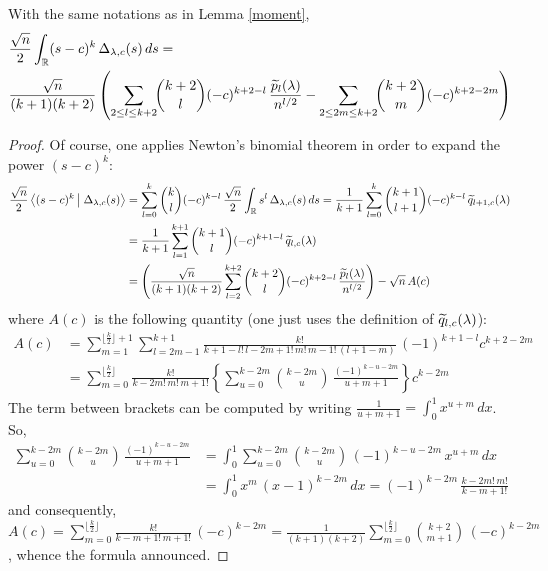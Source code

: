 \documentclass[10pt]{amsart}
\begin{document}
\begin{lemma}\label{transmoment}
With the same notations as in Lemma \ref{moment},
\begin{align*}&\frac{\sqrt{n}}{2}\int_{\mathbb{R}}(s-c)^{k}\,\Delta_{\lambda,c}(s)\,ds=\\
&\frac{\sqrt{n}}{(k+1)(k+2)}\left(\sum_{2 \leq l \leq k+2}\!\! \binom{k+2}{l} (-c)^{k+2-l}\,\frac{\widetilde{p}_{l}(\lambda)}{n^{l/2}}-\sum_{2 \leq 2m \leq k+2}\!\! \binom{k+2}{m} (-c)^{k+2-2m}\right)
\end{align*}
\end{lemma}\medskip
\begin{proof}
Of course, one applies Newton's binomial theorem in order to expand the power $(s-c)^{k}$:
\begin{align*}
\frac{\sqrt{n}}{2}\scal{(s-c)^{k}}{\Delta_{\lambda,c}(s)}&=\sum_{l=0}^{k}\binom{k}{l}(-c)^{k-l}\,\frac{\sqrt{n}}{2}\int_{\R}s^{l}\,\Delta_{\lambda,c}(s)\,ds=\frac{1}{k+1}\sum_{l=0}^{k}\binom{k+1}{l+1}(-c)^{k-l}\,\tilq_{l+1,c}(\lambda)\\
&=\frac{1}{k+1}\sum_{l=1}^{k+1}\binom{k+1}{l}(-c)^{k+1-l}\,\tilq_{l,c}(\lambda)\\
&=\left(\frac{\sqrt{n}}{(k+1)(k+2)}\sum_{l=2}^{k+2}\binom{k+2}{l}(-c)^{k+2-l}\,\frac{\tilp_{l}(\lambda)}{n^{l/2}}\right)-\sqrt{n}\,A(c)
\end{align*}
where $A(c)$ is the following quantity (one just uses the definition of $\widetilde{q}_{l,c}(\lambda)$):
\begin{align*}
A(c)&=\sum_{m=1}^{\lfloor \frac{k}{2}\rfloor +1} \sum_{l=2m-1}^{k+1} \frac{k!}{k+1-l!\,l-2m+1!\,m!\,m-1!\, (l+1-m)}\,(-1)^{k+1-l}c^{k+2-2m} \\
&=\sum_{m=0}^{\lfloor \frac{k}{2}\rfloor} \frac{k!}{k-2m!\,m!\,m+1!}\left\{\sum_{u=0}^{k-2m} \binom{k-2m}{u}\,\frac{(-1)^{k-u-2m}}{u+m+1}\right\}c^{k-2m}
\end{align*}
The term between brackets can be computed by writing $\frac{1}{u+m+1}=\int_{0}^{1} x^{u+m}\,dx$. So,
\begin{align*}
\sum_{u=0}^{k-2m} \binom{k-2m}{u}\,\frac{(-1)^{k-u-2m}}{u+m+1}&=\int_{0}^{1} \sum_{u=0}^{k-2m} \binom{k-2m}{u}\,(-1)^{k-u-2m}\,x^{u+m}\,dx\\
&=\int_{0}^{1}x^{m}\,(x-1)^{k-2m}\,dx=(-1)^{k-2m}\,\frac{k-2m!\,m!}{k-m+1!}
\end{align*}
and consequently, $A(c)=\sum_{m=0}^{\lfloor \frac{k}{2}\rfloor} \frac{k!}{k-m+1!\,m+1!}\,(-c)^{k-2m}=\frac{1}{(k+1)(k+2)}\sum_{m=0}^{\lfloor \frac{k}{2}\rfloor} \binom{k+2}{m+1}\,(-c)^{k-2m}$, whence the formula announced.
\end{proof}
\bigskip
\end{document}
